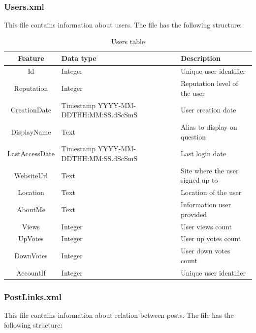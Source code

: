 \documentclass[11pt]{article} %
\begin{document}
    \subsubsection{Users.xml}

      This file contains information about users. The file has the following structure:

      \begin{table}[!ht]
        \begin{tabular}{|c|p{}|p{}|}
          \hline

          Feature & Data type & Description \\ \hline
          Id & Integer & Unique user identifier \\
          Reputation & Integer & Reputation level of the user \\ \hline
          CreationDate & Timestamp YYYY-MM-DDTHH:MM:SS.dScSmS & User creation date \\ \hline
          DisplayName & Text & Alias to display on question \\ \hline
          LastAccessDate & Timestamp YYYY-MM-DDTHH:MM:SS.dScSmS & Last login date \\ \hline
          WebsiteUrl & Text & Site where the user signed up to \\ \hline
          Location & Text & Location of the user \\ \hline
          AboutMe & Text & Information user provided \\ \hline
          Views & Integer & User views count \\ \hline
          UpVotes & Integer & User up votes count \\ \hline
          DownVotes & Integer & User down votes count \\ \hline
          AccountIf & Integer & Unique user identifier \\

          \hline
        \end{tabular}
        \caption{Users table}
        \label{tab:users}
      \end{table}

\newpage

    \subsubsection{PostLinks.xml}

      This file contains information about relation between posts. The file has the following structure:
\end{document}
